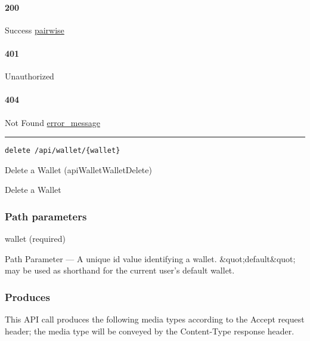 \hypertarget{section-284}{%
\paragraph{200}\label{section-284}}

Success \protect\hyperlink{pairwise}{pairwise}

\hypertarget{section-285}{%
\paragraph{401}\label{section-285}}

Unauthorized \protect\hyperlink{}{}

\hypertarget{section-286}{%
\paragraph{404}\label{section-286}}

Not Found \protect\hyperlink{error_message}{error\_message}

\begin{center}\rule{0.5\linewidth}{\linethickness}\end{center}

\protect\hypertarget{apiWalletWalletDelete}{}{}

\begin{verbatim}
delete /api/wallet/{wallet}
\end{verbatim}

Delete a Wallet ({apiWalletWalletDelete})

Delete a Wallet

\hypertarget{path-parameters-44}{%
\subsubsection{Path parameters}\label{path-parameters-44}}

wallet (required)

{Path Parameter} --- A unique id value identifying a wallet.
\&quot;default\&quot; may be used as shorthand for the current user's
default wallet.

\hypertarget{produces-86}{%
\subsubsection{Produces}\label{produces-86}}

This API call produces the following media types according to the
{Accept} request header; the media type will be conveyed by the
{Content-Type} response header.

